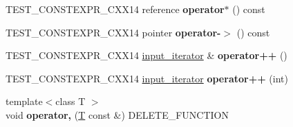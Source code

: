 \begin{DoxyCompactItemize}
\mbox{\label{classinput__iterator_a6197b2878c3a545e092ea3a8ab68424a}} 
T\+E\+S\+T\+\_\+\+C\+O\+N\+S\+T\+E\+X\+P\+R\+\_\+\+C\+X\+X14 reference {\bfseries operator$\ast$} () const
\item 
\mbox{\label{classinput__iterator_af9db2959b1a985bf8e88f329c05a23ec}} 
T\+E\+S\+T\+\_\+\+C\+O\+N\+S\+T\+E\+X\+P\+R\+\_\+\+C\+X\+X14 pointer {\bfseries operator-\/$>$} () const
\item 
\mbox{\label{classinput__iterator_a33b925a3b5ba3e892e0110cb61f1b457}} 
T\+E\+S\+T\+\_\+\+C\+O\+N\+S\+T\+E\+X\+P\+R\+\_\+\+C\+X\+X14 \mbox{\hyperlink{classinput__iterator}{input\+\_\+iterator}} \& {\bfseries operator++} ()
\item 
\mbox{\label{classinput__iterator_aa129325dcc2cdb4c8976800b017424a0}} 
T\+E\+S\+T\+\_\+\+C\+O\+N\+S\+T\+E\+X\+P\+R\+\_\+\+C\+X\+X14 \mbox{\hyperlink{classinput__iterator}{input\+\_\+iterator}} {\bfseries operator++} (int)
\item 
\mbox{\label{classinput__iterator_a21af33ee16e0092e8bbe27eb63c94fa4}} 
{\footnotesize template$<$class T $>$ }\\void {\bfseries operator,} (\mbox{\hyperlink{struct_t}{T}} const \&) D\+E\+L\+E\+T\+E\+\_\+\+F\+U\+N\+C\+T\+I\+ON
\end{DoxyCompactItemize}
